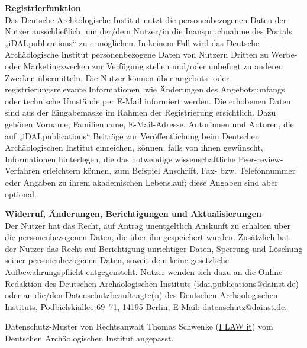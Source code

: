 {\textbf{Registrierfunktion}\\
Das Deutsche Archäologische Institut nutzt die personenbezogenen Daten der Nutzer ausschließlich, um der/dem Nutzer/in die Inanspruchnahme des Portals „iDAI.publications“ zu ermöglichen. In keinem Fall wird das Deutsche Archäologische Institut personenbezogene Daten von Nutzern Dritten zu Werbe- oder Marketingzwecken zur Verfügung stellen und/oder unbefugt zu anderen Zwecken übermitteln.
Die Nutzer können über angebots- oder registrierungsrelevante Informationen, wie Änderungen des Angebotsumfangs oder technische Umstände per E-Mail informiert werden. Die erhobenen Daten sind aus der Eingabemaske im Rahmen der Registrierung ersichtlich. Dazu gehören Vorname, Familienname, E-Mail-Adresse. Autorinnen und Autoren, die auf „iDAI.publications“ Beiträge zur Veröffentlichung beim Deutschen Archäologischen Institut einreichen, können, falls von ihnen gewünscht, Informationen hinterlegen, die das notwendige wissenschaftliche Peer-review-Verfahren erleichtern können, zum Beispiel Anschrift, Fax- bzw. Telefonnummer oder Angaben zu ihrem akademischen Lebenslauf; diese Angaben sind aber optional.

\textbf{Widerruf, Änderungen, Berichtigungen und Aktualisierungen}\\
Der Nutzer hat das Recht, auf Antrag unentgeltlich Auskunft zu erhalten über die personenbezogenen Daten, die über ihn gespeichert wurden. Zusätzlich hat der Nutzer das Recht auf Berichtigung unrichtiger Daten, Sperrung und Löschung seiner personenbezogenen Daten, soweit dem keine gesetzliche Aufbewahrungspflicht entgegensteht.
Nutzer wenden sich dazu an die Online-Redaktion des Deutschen Archäologischen Instituts (idai.publications@dainst.de) oder an die/den Datenschutzbeauftragte(n) des Deutschen Archäologischen Instituts, Podbielskiallee 69–71, 14195 Berlin, E-Mail: \href{mailto:datenschutz@dainst.de}{datenschutz@dainst.de}.

Datenschutz-Muster von Rechtsanwalt Thomas Schwenke (\href{http:/rechtsanwalt-schwenke.de/smmr-buch/datenschutz-muster-generator-fuer-webseiten-blogs-und-social-media/}{I LAW it}) vom Deutschen Archäologischen Institut angepasst.
}

